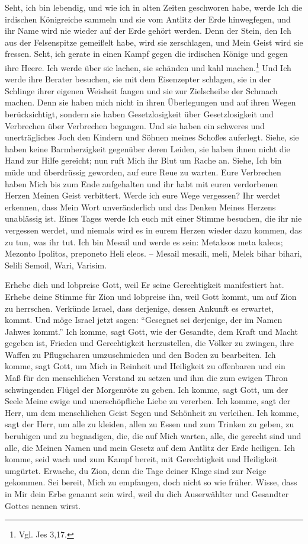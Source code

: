         Seht, ich bin lebendig, und wie ich in alten Zeiten geschworen habe, werde Ich die irdischen Königreiche sammeln und sie vom Antlitz der Erde hinwegfegen, und ihr Name wird nie wieder auf der Erde gehört werden. Denn der Stein, den Ich aus der Felsenspitze gemeißelt habe, wird sie zerschlagen, und Mein Geist wird sie fressen. Seht, ich gerate in einen Kampf gegen die irdischen Könige und gegen ihre Heere. Ich werde über sie lachen, sie schänden und kahl machen.\footnote{Vgl. Jes 3,17.} Und Ich werde ihre Berater besuchen, sie mit dem Eisenzepter schlagen, sie in der Schlinge ihrer eigenen Weisheit fangen und sie zur Zielscheibe der Schmach machen. Denn sie haben mich nicht in ihren Überlegungen und auf ihren Wegen berücksichtigt, sondern sie haben Gesetzlosigkeit über Gesetzlosigkeit und Verbrechen über Verbrechen begangen. Und sie haben ein schweres und unerträgliches Joch den Kindern und Söhnen meines Schoßes auferlegt. Siehe, sie haben keine Barmherzigkeit gegenüber deren Leiden, sie haben ihnen nicht die Hand zur Hilfe gereicht; nun ruft Mich ihr Blut um Rache an. Siehe, Ich bin müde und überdrüssig geworden, auf eure Reue zu warten. Eure Verbrechen haben Mich bis zum Ende aufgehalten und ihr habt mit euren verdorbenen Herzen Meinen Geist verbittert. Werde ich eure Wege vergessen? Ihr werdet erkennen, dass Mein Wort unveränderlich und das Denken Meines Herzens unablässig ist. Eines Tages werde Ich euch mit einer Stimme besuchen, die ihr nie vergessen werdet, und niemals wird es in eurem Herzen wieder dazu kommen, das zu tun, was ihr tut. Ich bin Mesail und werde es sein: Metaksos meta kaleos; Mezonto Ipolitos, preponeto Heli eleos. -- Mesail mesaili, meli, Melek bihar bihari, Selili Semoil, Wari, Varisim.
        
        Erhebe dich und lobpreise Gott, weil Er seine Gerechtigkeit manifestiert hat. Erhebe deine Stimme für Zion und lobpreise ihn, weil Gott kommt, um auf Zion zu herrschen. Verkünde Israel, dass derjenige, dessen Ankunft es erwartet, kommt. Und möge Israel jetzt sagen: "`Gesegnet sei derjenige, der im Namen Jahwes kommt."' Ich komme, sagt Gott, wie der Gesandte, dem Kraft und Macht gegeben ist, Frieden und Gerechtigkeit herzustellen, die Völker zu zwingen, ihre Waffen zu Pflugscharen umzuschmieden und den Boden zu bearbeiten. Ich komme, sagt Gott, um Mich in Reinheit und Heiligkeit zu offenbaren und ein Maß für den menschlichen Verstand zu setzen und ihm die zum ewigen Thron schwingenden Flügel der Morgenröte zu geben. Ich komme, sagt Gott, um der Seele Meine ewige und unerschöpfliche Liebe zu vererben. Ich komme, sagt der Herr, um dem menschlichen Geist Segen und Schönheit zu verleihen. Ich komme, sagt der Herr, um alle zu kleiden, allen zu Essen und zum Trinken zu geben, zu beruhigen und zu begnadigen, die, die auf Mich warten, alle, die gerecht sind und alle, die Meinen Namen und mein Gesetz auf dem Antlitz der Erde heiligen. Ich komme, seid wach und zum Kampf bereit, mit Gerechtigkeit und Heiligkeit umgürtet. Erwache, du Zion, denn die Tage deiner Klage sind zur Neige gekommen. Sei bereit, Mich zu empfangen, doch nicht so wie früher. Wisse, dass in Mir dein Erbe genannt sein wird, weil du dich Auserwählter und Gesandter Gottes nennen wirst. 
        
